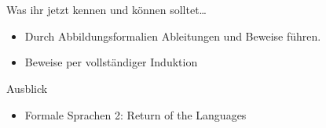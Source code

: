 \section{}
	\begin{frame}{Was ihr jetzt kennen und können solltet\dots}
			\begin{itemize}
				\item Durch Abbildungsformalien Ableitungen und Beweise führen.
				\item Beweise per vollständiger Induktion
			\end{itemize}
	
	\end{frame}
\begin{frame}[fragile]{Ausblick}
 		\begin{itemize}
 			\item Formale Sprachen 2: Return of the Languages
 		\end{itemize}
\end{frame}
\section{}
\questionframe
\lastframe
{}
